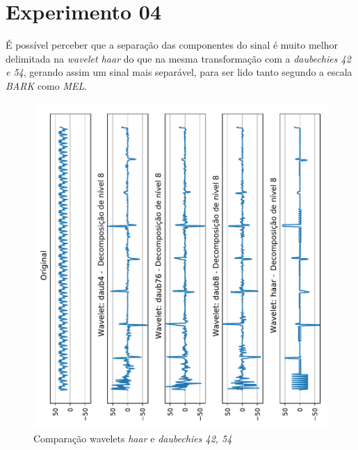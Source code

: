 	\newpage
	\section{Experimento 04}
	\label{chap:testsResults:sec:Experimento04}
		\par É possível perceber que a separação das componentes do sinal é muito melhor delimitada na \textit{wavelet haar} do que na mesma transformação com a \textit{daubechies 42 e 54}, gerando assim um sinal mais separável, para ser lido tanto segundo a escala \textit{BARK} como \textit{MEL}.
				
		\begin{figure}[h]
			\centering
			\includegraphics[width=0.6\linewidth]{images/results/haarDaubComparison/haarDaub42Comparison.pdf}
			\caption{Comparação wavelets \textit{haar} e \textit{daubechies 42, 54}}
			\label{fig:haardaub42comparison}
		\end{figure}
		
	\newpage
